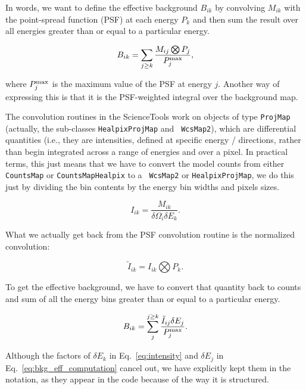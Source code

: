 \documentclass[preprint]{aastex}
\begin{document}
In words, we want to define the effective background $B_{ik}$ by
convolving $M_{ik}$ with the point-spread function (PSF) at each
energy $P_k$ and then sum the result over all energies greater than or
equal to a particular energy.

\begin{equation}\label{eq:bkg_eff_defintion}
B_{ik} = \sum_{j \ge k} \frac{M_{ij} \bigotimes P_{j}}{P_{j}^{\rm max}}, 
\end{equation}

\noindent where $P_{j}^{\rm max}$ is the maximum value of the PSF at energy $j$.
Another way of expressing this is that it is the PSF-weighted integral over
the background map.  

The convolution routines in the ScienceTools work on objects of type
{\tt ProjMap} (actually, the sub-classes {\tt HealpixProjMap} and {\tt
  WcsMap2}), which are differential quantities (i.e., they are
intensities, defined at specific energy / directions, rather than
begin integrated across a range of energies and over a pixel.  In
practical terms, this just means that we have to convert the model
counts from either {\tt CountsMap} or {\tt CountsMapHealpix} to a {\tt
  WcsMap2} or {\tt HealpixProjMap}, we do this just by dividing the
bin contents by the energy bin widths and pixels sizes.

\begin{equation}\label{eq:intensity}
I_{ik} = \frac{M_{ik}}{\delta \Omega_i \delta E_k}.
\end{equation}

\noindent What we actually get back from the PSF convolution routine
is the normalized convolution:

\begin{equation}\label{eq:convolved_intensity}
\tilde{I}_{ik} = I_{ik} \bigotimes P_{k}.
\end{equation}

To get the effective background, we have to convert that quantity back
to counts and sum of all the energy bins greater than or equal to a
particular energy.

\begin{equation}\label{eq:bkg_eff_computation}
B_{ik} = \sum_{j}^{j \ge k} \frac{\tilde{I}_{ij} \delta E_j}{P_{j}^{\rm max}}.
\end{equation}

\noindent Although the factors of $\delta E_k$ in Eq.~\ref{eq:intensity}
and $\delta E_j$ in Eq.~\ref{eq:bkg_eff_computation} cancel out, we have 
explicitly kept them in the notation, as they appear in the code because
of the way it is structured.
\end{document}

